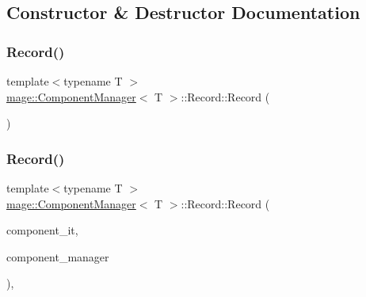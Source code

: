 \subsection{Constructor \& Destructor Documentation}
\mbox{\label{classmage_1_1_component_manager_1_1_record_a404e53e118de147026911892f572c70a}} 
\subsubsection{\texorpdfstring{Record()}{Record()}\hspace{0.1cm}{\footnotesize\ttfamily [1/4]}}
{\footnotesize\ttfamily template$<$typename T $>$ \\
\mbox{\hyperlink{classmage_1_1_component_manager}{mage\+::\+Component\+Manager}}$<$ T $>$\+::Record\+::\+Record (\begin{DoxyParamCaption}{ }\end{DoxyParamCaption})\hspace{0.3cm}{\ttfamily [noexcept]}}

\mbox{\label{classmage_1_1_component_manager_1_1_record_a355af51c1e497d21bbe6612add6fe7a9}} 
\subsubsection{\texorpdfstring{Record()}{Record()}\hspace{0.1cm}{\footnotesize\ttfamily [2/4]}}
{\footnotesize\ttfamily template$<$typename T $>$ \\
\mbox{\hyperlink{classmage_1_1_component_manager}{mage\+::\+Component\+Manager}}$<$ T $>$\+::Record\+::\+Record (\begin{DoxyParamCaption}\item[{\mbox{\hyperlink{classmage_1_1_component_manager_1_1_record_ac9f303d103be56826be484204f17c249}{Component\+Iterator}}}]{component\+\_\+it,  }\item[{\mbox{\hyperlink{classmage_1_1_component_manager}{Component\+Manager}} $\ast$}]{component\+\_\+manager }\end{DoxyParamCaption})\hspace{0.3cm}{\ttfamily [explicit]}, {\ttfamily [noexcept]}}

